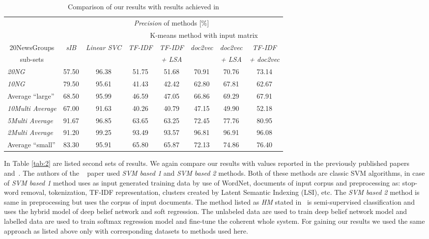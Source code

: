 \documentclass[runningheads,a4paper]{llncs}
\begin{document}
\begin{table}[]
\centering
\caption[Data]{Comparison of our results with results achieved in \cite{refVysEval}}
\label{tab:1}
\begin{tabular}{|l||c|c||c|c|c|c|c|}
\hline
& \multicolumn{7}{c|}{\emph{Precision} of methods [\%]} \\ \cline{2-8}
& & & \multicolumn{5}{c|}{K-means method with input matrix} \\ \cline{4-8}
\multicolumn{1}{|c||}{20NewsGroups}  & \emph{sIB} & \emph{Linear SVC} & \emph{TF-IDF} & \emph{TF-IDF} & \emph{doc2vec} &  \emph{doc2vec} &  \emph{TF-IDF}\\ 
 \multicolumn{1}{|c||}{sub-sets} &  &  &  & \emph{+ LSA} & & \emph{+ LSA} & \emph{+ doc2vec} \\  \hline \hline
\emph{20NG}     		& 57.50 & 96.38 & 51.75 & 51.68 & 70.91 & 70.76 & 73.14 \\ \hline 
\emph{10NG}     		& 79.50 & 95.61 & 41.43 & 42.42 & 62.80 & 67.81 & 62.67\\ \hline
Average ``large''  	& 68.50 & 95.99 & 46.59 & 47.05 & 66.86 & 69.29 & 67.91\\ \hline \hline
\emph{10Multi Average} & 67.00 & 91.63 & 40.26 & 40.79 & 47.15 & 49.90 & 52.18\\ \hline
\emph{5Multi Average} 	& 91.67 & 96.85 & 63.65 & 63.25 & 72.45 & 77.76 & 80.95\\ \hline
\emph{2Multi Average} 	& 91.20 & 99.25 & 93.49 & 93.57 & 96.81 & 96.91 & 96.08\\ \hline
Average ``small''  	& 83.30 & 95.91 & 65.80 & 65.87 & 72.13 & 74.86 & 76.40\\ \hline 
\end{tabular}
\end{table}


In Table \ref{tab:2} are listed second sets of results. We again compare our results with values reported in the previously published papers~\cite{chinniyan2017semantic} and~\cite{jiang2018text}. The authors of the ~\cite{chinniyan2017semantic} paper used \emph{SVM based 1} and \emph{SVM based 2} methods. Both of these methods are classic SVM algorithms, in case of \emph{SVM based 1} method uses as input generated training data by use of WordNet, documents of input corpus and preprocessing as: stop-word removal, tokenization, TF-IDF representation, clusters created by Latent Semantic Indexing (LSI), etc. The \emph{SVM based 2} method is same in preprocessing but uses the corpus of input documents. The method listed as \emph{HM} stated in~\cite{jiang2018text} is semi-supervised classification and uses the hybrid model of deep belief network and soft regression. The unlabeled data are used to train deep belief network model and labelled data are used to train softmax regression model and fine-tune the coherent whole system. For gaining our results we used the same approach as listed above only with corresponding datasets to methods used here.  
\end{document}
